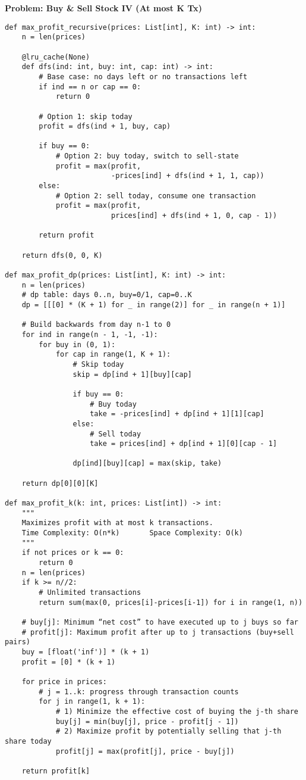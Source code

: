 \noindent\textbf{Problem: Buy \& Sell Stock IV (At most K Tx)}
\begin{verbatim}
def max_profit_recursive(prices: List[int], K: int) -> int:
    n = len(prices)

    @lru_cache(None)
    def dfs(ind: int, buy: int, cap: int) -> int:
        # Base case: no days left or no transactions left
        if ind == n or cap == 0:
            return 0

        # Option 1: skip today
        profit = dfs(ind + 1, buy, cap)

        if buy == 0:
            # Option 2: buy today, switch to sell-state
            profit = max(profit,
                         -prices[ind] + dfs(ind + 1, 1, cap))
        else:
            # Option 2: sell today, consume one transaction
            profit = max(profit,
                         prices[ind] + dfs(ind + 1, 0, cap - 1))

        return profit

    return dfs(0, 0, K) 

def max_profit_dp(prices: List[int], K: int) -> int:
    n = len(prices)
    # dp table: days 0..n, buy=0/1, cap=0..K
    dp = [[[0] * (K + 1) for _ in range(2)] for _ in range(n + 1)]

    # Build backwards from day n-1 to 0
    for ind in range(n - 1, -1, -1):
        for buy in (0, 1):
            for cap in range(1, K + 1):
                # Skip today
                skip = dp[ind + 1][buy][cap]

                if buy == 0:
                    # Buy today
                    take = -prices[ind] + dp[ind + 1][1][cap]
                else:
                    # Sell today
                    take = prices[ind] + dp[ind + 1][0][cap - 1]

                dp[ind][buy][cap] = max(skip, take)

    return dp[0][0][K]

def max_profit_k(k: int, prices: List[int]) -> int:
    """
    Maximizes profit with at most k transactions.
    Time Complexity: O(n*k)       Space Complexity: O(k)
    """
    if not prices or k == 0:
        return 0
    n = len(prices)
    if k >= n//2:
        # Unlimited transactions
        return sum(max(0, prices[i]-prices[i-1]) for i in range(1, n))
    
    # buy[j]: Minimum “net cost” to have executed up to j buys so far
    # profit[j]: Maximum profit after up to j transactions (buy+sell pairs)
    buy = [float('inf')] * (k + 1)
    profit = [0] * (k + 1)

    for price in prices:
        # j = 1..k: progress through transaction counts
        for j in range(1, k + 1):
            # 1) Minimize the effective cost of buying the j-th share
            buy[j] = min(buy[j], price - profit[j - 1])
            # 2) Maximize profit by potentially selling that j-th share today
            profit[j] = max(profit[j], price - buy[j])

    return profit[k]
\end{verbatim}

